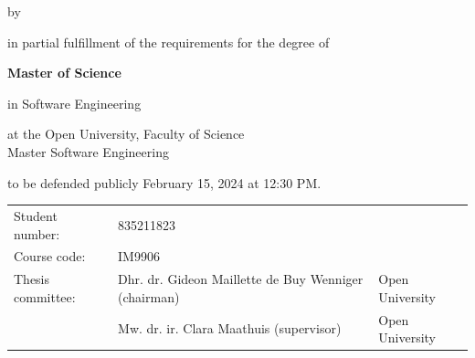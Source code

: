 \begin{titlepage}

\begin{center}


\vspace*{2\bigskipamount}

{\makeatletter
\titlestyle\color{red}\Huge\@title
\makeatother}

{\makeatletter
\ifx\@subtitle\undefined\else
    \bigskip
    \titlefont\titleshape\LARGE\@subtitle}
\fi
\bigskip
\bigskip

by

\bigskip
\bigskip

{\makeatletter
\titlefont\Large\bfseries\@author
\makeatother}

\vfill

in partial fulfillment of the requirements for the degree of

\bigskip
\bigskip

{\bfseries Master of Science}

in Software Engineering

\bigskip
\bigskip

at the Open University, Faculty of Science \\
Master Software Engineering

to be defended publicly February 15, 2024 at 12:30 PM.

\vfill

\begin{tabular}{lll}
    Student number: & 835211823 \\
    Course code: & IM9906\\
    Thesis committee:
        & Dhr. dr. Gideon Maillette de Buy Wenniger (chairman) & Open University \\
        & Mw. dr. ir. Clara Maathuis (supervisor) & Open University
\end{tabular}

\bigskip


\bigskip

\end{center}

\end{titlepage} 
